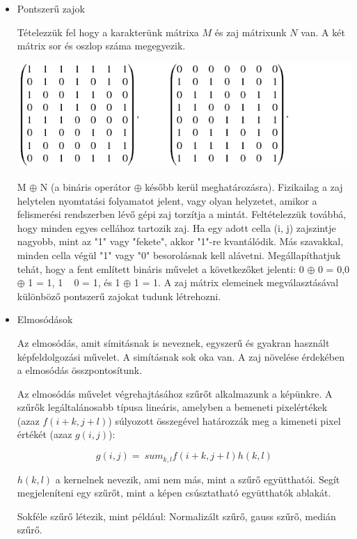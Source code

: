 \begin{itemize}
\item Pontszerű zajok

Tételezzük fel hogy a karakterünk mátrixa $M$ és zaj mátrixunk $N$ van. A két mátrix sor és oszlop száma megegyezik.

\begin{center}
\includegraphics[scale=0.6]{images/noise_matrix}
\end{center}

M $\oplus$ N (a bináris operátor $\oplus$ később kerül meghatározásra). Fizikailag a zaj helytelen nyomtatási folyamatot jelent, vagy olyan helyzetet, amikor a felismerési rendszerben lévő gépi zaj torzítja a mintát. Feltételezzük továbbá, hogy minden egyes cellához tartozik zaj.
Ha egy adott cella (i, j) zajszintje nagyobb, mint az "1" vagy "fekete", akkor "1"-re kvantálódik. Más szavakkal, minden cella végül "1" vagy "0" besorolásnak kell alávetni. Megállapíthatjuk tehát, hogy a fent említett bináris művelet a következőket jelenti: 0 $\oplus$ 0 = 0,0 $\oplus$ 1 = 1, 1 ~ 0 = 1, és 1 $\oplus$ 1 = 1.
A zaj mátrix elemeinek megválasztásával különböző pontszerű zajokat tudunk létrehozni.
\item Elmosódások

Az elmosódás, amit símitásnak is neveznek, egyszerű és gyakran használt képfeldolgozási művelet. A simításnak sok oka van. A zaj növelése érdekében a elmosódás összpontosítunk.

Az elmosódás művelet végrehajtásához szűrőt alkalmazunk a képünkre. A szűrők legáltalánosabb típusa lineáris, amelyben a bemeneti pixelértékek (azaz $f(i+k, j+l)$) súlyozott összegével határozzák meg a kimeneti pixel értékét (azaz $g(i, j)$):

\[g (i, j) = \ sum_ {k, l} f (i + k, j + l) h (k, l)\]

$h(k, l)$ a kernelnek nevezik, ami nem más, mint a szűrő együtthatói. Segít megjeleníteni egy szűrőt, mint a képen csúsztatható együtthatók ablakát.

Sokféle szűrő létezik, mint például: Normalizált szűrő, gauss szűrő, medián szűrő.


\end{itemize}
